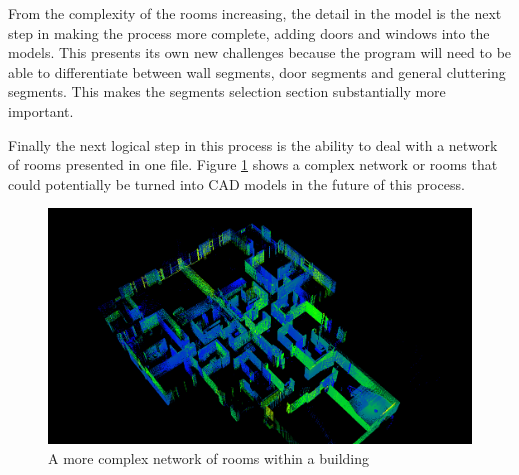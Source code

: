 	From the complexity of the rooms increasing, the detail in the model is the next step in making the process more complete, adding doors and windows into the models. This presents its own new challenges because the program will need to be able to differentiate between wall segments, door segments and general cluttering segments. This makes the segments selection section substantially more important.
	
	Finally the next logical step in this process is the ability to deal with a network of rooms presented in one file. Figure \ref{fig:complexscene} shows a complex network or rooms that could potentially be turned into CAD models in the future of this process. 
	
	
	\begin{figure}[htb]
		\centering
		\includegraphics[width=0.8\linewidth]{"Includes/images/Results/complex scene"}
		\caption{A more complex network of rooms within a building}
		\label{fig:complexscene}
	\end{figure}
	
